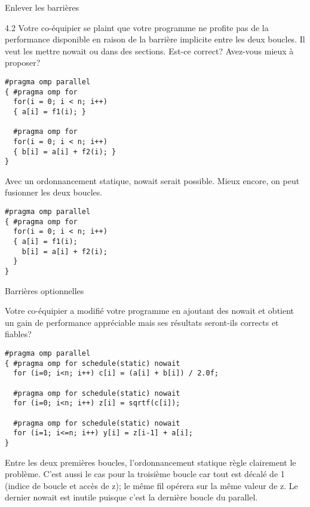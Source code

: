 \documentclass{beamer}
\begin{document}
\begin{frame}[fragile]{Enlever les barrières}
  \begin{longquestion}
4.2 Votre co-équipier se plaint que votre programme ne profite pas de la performance disponible en raison de la barrière implicite entre les deux boucles. Il veut les mettre nowait ou dans des sections. Est-ce correct? Avez-vous mieux à proposer?

    \begin{verbatim}
#pragma omp parallel 
{ #pragma omp for
  for(i = 0; i < n; i++)
  { a[i] = f1(i); }

  #pragma omp for
  for(i = 0; i < n; i++)
  { b[i] = a[i] + f2(i); }
}
    \end{verbatim}
  \end{longquestion}
  \begin{answer}
Avec un ordonnancement statique, nowait serait possible. Mieux encore, on peut fusionner les deux boucles.

    \begin{verbatim}
#pragma omp parallel 
{ #pragma omp for
  for(i = 0; i < n; i++)
  { a[i] = f1(i);
    b[i] = a[i] + f2(i); 
  }
}
    \end{verbatim}
  \end{answer}
\end{frame}

\begin{frame}[fragile]{Barrières optionnelles}
  \begin{longquestion}
Votre co-équipier a modifié votre programme en ajoutant des nowait et obtient un gain de performance appréciable mais ses résultats seront-ils corrects et fiables?

    \begin{verbatim}
#pragma omp parallel
{ #pragma omp for schedule(static) nowait
  for (i=0; i<n; i++) c[i] = (a[i] + b[i]) / 2.0f;

  #pragma omp for schedule(static) nowait
  for (i=0; i<n; i++) z[i] = sqrtf(c[i]);

  #pragma omp for schedule(static) nowait
  for (i=1; i<=n; i++) y[i] = z[i-1] + a[i];
}
    \end{verbatim}
  \end{longquestion}
  \begin{answer}
Entre les deux premières boucles, l'ordonnancement statique règle clairement le problème. C'est aussi le cas pour la troisième boucle car tout est décalé de 1 (indice de boucle et accès de z); le même fil opérera sur la même valeur de z. Le dernier nowait est inutile puisque c'est la dernière boucle du parallel.
  \end{answer}
\end{frame}
\end{document}
